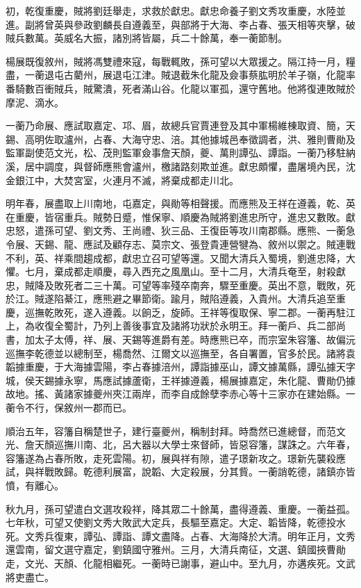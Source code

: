\begin{pinyinscope}
初，乾復重慶，賊將劉廷舉走，求救於獻忠。獻忠命養子劉文秀攻重慶，水陸並進。副將曾英與參政劉麟長自遵義至，與部將于大海、李占春、張天相等夾擊，破賊兵數萬。英威名大振，諸別將皆屬，兵二十餘萬，奉一蘅節制。

楊展既復敘州，賊將馮雙禮來寇，每戰輒敗，孫可望以大眾援之。隔江持一月，糧盡，一蘅退屯古藺州，展退屯江津。賊退截朱化龍及僉事蔡肱明於羊子嶺，化龍率番騎數百衝賊兵，賊驚潰，死者滿山谷。化龍以軍孤，還守舊地。他將復連敗賊於摩泥、滴水。

一蘅乃命展、應試取嘉定、邛、眉，故總兵官賈連登及其中軍楊維棟取資、簡，天錫、高明佐取瀘州，占春、大海守忠、涪。其他據城邑奉徵調者，洪、雅則曹勛及監軍副使范文光，松、茂則監軍僉事詹天顏，夔、萬則譚弘、譚詣。一蘅乃移駐納溪，居中調度，與督師應熊會瀘州，檄諸路刻欺並進。獻忠頗懼，盡屠境內民，沈金銀江中，大焚宮室，火連月不滅，將棄成都走川北。

明年春，展盡取上川南地，屯嘉定，與勛等相聲援。而應熊及王祥在遵義，乾、英在重慶，皆宿重兵。賊勢日蹙，惟保寧、順慶為賊將劉進忠所守，進忠又數敗。獻忠怒，遣孫可望、劉文秀、王尚禮、狄三品、王復臣等攻川南郡縣。應熊、一蘅急令展、天錫、龍、應試及顧存志、莫宗文、張登貴連營犍為、敘州以禦之。賊連戰不利，英、祥乘間趨成都，獻忠立召可望等還。又聞大清兵入蜀境，劉進忠降，大懼。七月，棄成都走順慶，尋入西充之風凰山。至十二月，大清兵奄至，射殺獻忠，賊降及敗死者二三十萬。可望等率殘卒南奔，驟至重慶。英出不意，戰敗，死於江。賊遂陷綦江，應熊避之畢節衛。踰月，賊陷遵義，入貴州。大清兵追至重慶，巡撫乾敗死，遂入遵義。以餉乏，旋師。王祥等復取保、寧二郡。一蘅再駐江上，為收復全蜀計，乃列上善後事宜及諸將功狀於永明王。拜一蘅戶、兵二部尚書，加太子太傅，祥、展、天錫等進爵有差。時應熊已卒，而宗室朱容籓、故偏沅巡撫李乾德並以總制至，楊喬然、江爾文以巡撫至，各自署置，官多於民。諸將袁韜據重慶，于大海據雲陽，李占春據涪州，譚詣據巫山，譚文據萬縣，譚弘據天字城，侯天錫據永寧，馬應試據蘆衛，王祥據遵義，楊展據嘉定，朱化龍、曹勛仍據故地。搖、黃諸家據夔州夾江兩岸，而李自成餘孽李赤心等十三家亦在建始縣。一蘅令不行，保敘州一郡而已。

順治五年，容籓自稱楚世子，建行臺夔州，稱制封拜。時喬然已進總督，而范文光、詹天顏巡撫川南、北，呂大器以大學士來督師，皆惡容籓，謀誅之。六年春，容籓遂為占春所敗，走死雲陽。初，展與祥有隙，遣子璟新攻之。璟新先襲殺應試，與祥戰敗歸。乾德利展富，說韜、大定殺展，分其貲。一蘅誚乾德，諸鎮亦皆憤，有離心。

秋九月，孫可望遣白文選攻殺祥，降其眾二十餘萬，盡得遵義、重慶。一蘅益孤。七年秋，可望又使劉文秀大敗武大定兵，長驅至嘉定。大定、韜皆降，乾德投水死。文秀兵復東，譚弘、譚詣、譚文盡降。占春、大海降於大清。明年正月，文秀還雲南，留文選守嘉定，劉鎮國守雅州。三月，大清兵南征，文選、鎮國挾曹勛走，文光、天顏、化龍相繼死。一蘅時已謝事，避山中。至九月，亦遘疾死。文武將吏盡亡。


\end{pinyinscope}
